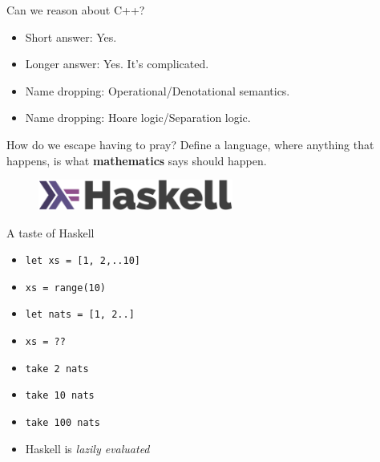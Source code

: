 \documentclass[8pt]{beamer}
\newcommand{\py}[1]{\texttt{#1}}
\newcommand{\hs}[1]{\texttt{#1}}
\begin{document}
\begin{frame}[fragile]{Can we reason about C++?}
    \pause
    \begin{itemize}
    \item Short answer: Yes. \pause
    \item Longer answer: Yes. It's complicated. \pause
    \item Name dropping: Operational/Denotational semantics. \pause
    \item Name dropping: Hoare logic/Separation logic. \pause
    \end{itemize}
\end{frame}


\begin{frame}[fragile]{How do we escape having to pray?}
    \pause
    Define a language, \pause where anything that happens, \pause is what \textbf{mathematics} says should happen.
    \pause

\begin{figure}
\includegraphics[height=1cm]{./haskell-logo.png}
\end{figure}
\end{frame}

\begin{frame}[fragile]{A taste of Haskell}
    \begin{itemize}
        \item \hs{let xs = [1, 2,..10]} \pause
        \item \py{xs = range(10)} \pause
        \item \hs{let nats = [1, 2..]} \pause
        \item \py{xs = ??} \pause
        \item \hs{take 2 nats} \pause
        \item \hs{take 10 nats} \pause
        \item \hs{take 100 nats} \pause
        \item Haskell is \emph{lazily evaluated} \pause
    \end{itemize}
\end{frame}
\end{document}
